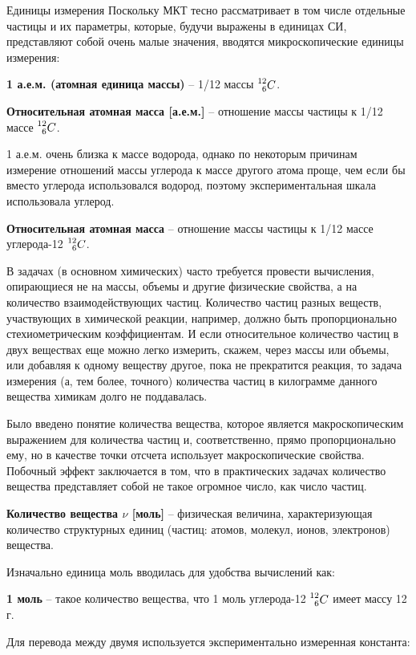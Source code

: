 \documentclass{article}
\newcommand{\definition}[2]{\begin{samepage} \textbf{#1} -- #2. \end{samepage} \par}
\begin{document}
	\begin{section}{Единицы измерения}
		Поскольку МКТ тесно рассматривает в том числе отдельные частицы и их параметры, которые, будучи выражены в единицах СИ, представляют собой очень малые значения, вводятся микроскопические единицы измерения:

		\definition{1 а.е.м. (атомная единица массы)}{1/12 массы $\prescript{12}{6}{C}$}

		\definition{Относительная атомная масса [а.е.м.]}{отношение массы частицы к 1/12 массе $\prescript{12}{6}{C}$}

		1 а.е.м. очень близка к массе водорода, однако по некоторым причинам измерение отношений массы углерода к массе другого атома проще, чем если бы вместо углерода использовался водород, поэтому экспериментальная шкала использовала углерод.

		\definition{Относительная атомная масса}{отношение массы частицы к 1/12 массе углерода-12 $\prescript{12}{6}{C}$}

		В задачах (в основном химических) часто требуется провести вычисления, опирающиеся не на массы, объемы и другие физические свойства, а на количество взаимодействующих частиц. Количество частиц разных веществ, участвующих в химической реакции, например, должно быть пропорционально стехиометрическим коэффициентам. И если относительное количество частиц в двух веществах еще можно легко измерить, скажем, через массы или объемы, или добавляя к одному веществу другое, пока не прекратится реакция, то задача измерения (а, тем более, точного) количества частиц в килограмме данного вещества химикам долго не поддавалась.

		Было введено понятие количества вещества, которое является макроскопическим выражением для количества частиц и, соответственно, прямо пропорционально ему, но в качестве точки отсчета использует макроскопические свойства. Побочный эффект заключается в том, что в практических задачах количество вещества представляет собой не такое огромное число, как число частиц.

		\definition{Количество вещества $\nu$ [моль]}{физическая величина, характеризующая количество структурных единиц (частиц: атомов, молекул, ионов, электронов) вещества}

		Изначально единица моль вводилась для удобства вычислений как:

		\definition{1 моль}{такое количество вещества, что 1 моль углерода-12 $\prescript{12}{6}{C}$ имеет массу 12 г}

		Для перевода между двумя используется экспериментально измеренная константа:


\end{section}
\end{document}

